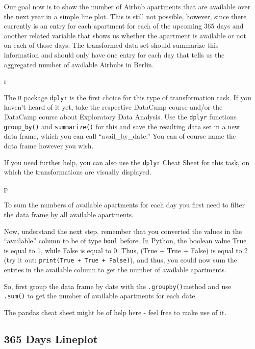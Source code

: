 \documentclass[
  11pt,
]{book}
\begin{document}
Our goal now is to show the number of Airbnb apartments that are
available over the next year in a simple line plot. This is still not
possible, however, since there currently is an entry for each apartment
for each of the upcoming 365 days and another related variable that
shows us whether the apartment is available or not on each of those
days. The transformed data set should summarize this information and
should only have one entry for each day that tells us the aggregated
number of available Airbnbs in Berlin.

\begin{tips}r

The \texttt{R} package \texttt{dplyr} is the first choice for this type
of transformation task. If you haven't heard of it yet, take the
respective DataCamp course and/or the DataCamp course about Exploratory
Data Analysis. Use the \texttt{dplyr} functions \texttt{group\_by()} and
\texttt{summarize()} for this and save the resulting data set in a new
data frame, which you can call ``avail\_by\_date.'' You can of course
name the data frame however you wish.

If you need further help, you can also use the \texttt{dplyr} Cheat
Sheet for this task, on which the transformations are visually
displayed.

\end{tips}

\begin{tipsp}p

To sum the numbers of available apartments for each day you first need
to filter the data frame by all available apartments.

Now, understand the next step, remember that you converted the values in
the ``available'' column to be of type \texttt{bool} before. In Python,
the boolean value True is equal to 1, while False is equal to 0. Thus,
(True + True + False) is equal to 2 (try it out:
\texttt{print(True\ +\ True\ +\ False)}), and thus, you could now sum
the entries in the available column to get the number of available
apartments.

So, first group the data frame by date with the
\texttt{.groupby()}method and use \texttt{.sum()} to get the number of
available apartments for each date.

The pandas cheat sheet might be of help here - feel free to make use of
it.

\end{tipsp}

\hypertarget{days-lineplot}{%
\subsection{365 Days Lineplot}\label{days-lineplot}}
\end{document}
